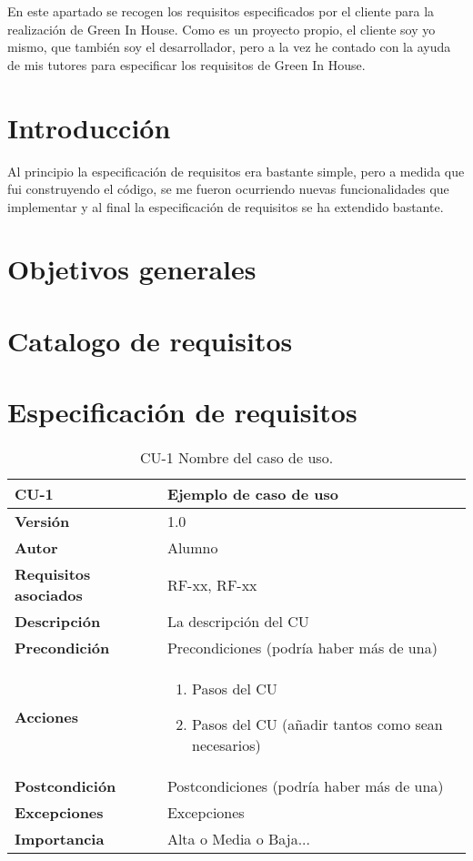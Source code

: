 En este apartado se recogen los requisitos especificados por el cliente para la realización de Green In House. Como es un proyecto propio, el cliente soy yo mismo, que también soy el desarrollador, pero a la vez he contado con la ayuda de mis tutores para especificar los requisitos de Green In House.

\section{Introducción}
Al principio la especificación de requisitos era bastante simple, pero a medida que fui construyendo el código, se me fueron ocurriendo nuevas funcionalidades que implementar y al final la especificación de requisitos se ha extendido bastante.

\section{Objetivos generales}
\section{Catalogo de requisitos}
\section{Especificación de requisitos}

\begin{table}[p]
	\centering
	\begin{tabularx}{\linewidth}{ p{} p{} }
		\toprule
		\textbf{CU-1}    & \textbf{Ejemplo de caso de uso}\\
		\toprule
		\textbf{Versión}              & 1.0    \\
		\textbf{Autor}                & Alumno \\
		\textbf{Requisitos asociados} & RF-xx, RF-xx \\
		\textbf{Descripción}          & La descripción del CU \\
		\textbf{Precondición}         & Precondiciones (podría haber más de una) \\
		\textbf{Acciones}             &
		\begin{enumerate}
			\def\labelenumi{\arabic{enumi}.}
			\tightlist
			\item Pasos del CU
			\item Pasos del CU (añadir tantos como sean necesarios)
		\end{enumerate}\\
		\textbf{Postcondición}        & Postcondiciones (podría haber más de una) \\
		\textbf{Excepciones}          & Excepciones \\
		\textbf{Importancia}          & Alta o Media o Baja... \\
		\bottomrule
	\end{tabularx}
	\caption{CU-1 Nombre del caso de uso.}
\end{table}